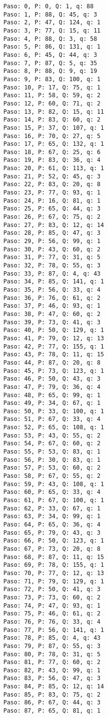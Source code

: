 \documentclass[a4paper]{article}
\begin{document}
\begin{verbatim}
Paso: 0, P: 0, Q: 1, q: 88
Paso: 1, P: 88, Q: 45, q: 3
Paso: 2, P: 47, Q: 124, q: 1
Paso: 3, P: 77, Q: 15, q: 11
Paso: 4, P: 88, Q: 3, q: 58
Paso: 5, P: 86, Q: 131, q: 1
Paso: 6, P: 45, Q: 44, q: 3
Paso: 7, P: 87, Q: 5, q: 35
Paso: 8, P: 88, Q: 9, q: 19
Paso: 9, P: 83, Q: 100, q: 1
Paso: 10, P: 17, Q: 75, q: 1
Paso: 11, P: 58, Q: 59, q: 2
Paso: 12, P: 60, Q: 71, q: 2
Paso: 13, P: 82, Q: 15, q: 11
Paso: 14, P: 83, Q: 60, q: 2
Paso: 15, P: 37, Q: 107, q: 1
Paso: 16, P: 70, Q: 27, q: 5
Paso: 17, P: 65, Q: 132, q: 1
Paso: 18, P: 67, Q: 25, q: 6
Paso: 19, P: 83, Q: 36, q: 4
Paso: 20, P: 61, Q: 113, q: 1
Paso: 21, P: 52, Q: 45, q: 3
Paso: 22, P: 83, Q: 20, q: 8
Paso: 23, P: 77, Q: 93, q: 1
Paso: 24, P: 16, Q: 81, q: 1
Paso: 25, P: 65, Q: 44, q: 3
Paso: 26, P: 67, Q: 75, q: 2
Paso: 27, P: 83, Q: 12, q: 14
Paso: 28, P: 85, Q: 47, q: 3
Paso: 29, P: 56, Q: 99, q: 1
Paso: 30, P: 43, Q: 60, q: 2
Paso: 31, P: 77, Q: 31, q: 5
Paso: 32, P: 78, Q: 55, q: 3
Paso: 33, P: 87, Q: 4, q: 43
Paso: 34, P: 85, Q: 141, q: 1
Paso: 35, P: 56, Q: 33, q: 4
Paso: 36, P: 76, Q: 61, q: 2
Paso: 37, P: 46, Q: 93, q: 1
Paso: 38, P: 47, Q: 60, q: 2
Paso: 39, P: 73, Q: 41, q: 3
Paso: 40, P: 50, Q: 129, q: 1
Paso: 41, P: 79, Q: 12, q: 13
Paso: 42, P: 77, Q: 155, q: 1
Paso: 43, P: 78, Q: 11, q: 15
Paso: 44, P: 87, Q: 20, q: 8
Paso: 45, P: 73, Q: 123, q: 1
Paso: 46, P: 50, Q: 43, q: 3
Paso: 47, P: 79, Q: 36, q: 4
Paso: 48, P: 65, Q: 99, q: 1
Paso: 49, P: 34, Q: 67, q: 1
Paso: 50, P: 33, Q: 100, q: 1
Paso: 51, P: 67, Q: 33, q: 4
Paso: 52, P: 65, Q: 108, q: 1
Paso: 53, P: 43, Q: 55, q: 2
Paso: 54, P: 67, Q: 60, q: 2
Paso: 55, P: 53, Q: 83, q: 1
Paso: 56, P: 30, Q: 83, q: 1
Paso: 57, P: 53, Q: 60, q: 2
Paso: 58, P: 67, Q: 55, q: 2
Paso: 59, P: 43, Q: 108, q: 1
Paso: 60, P: 65, Q: 33, q: 4
Paso: 61, P: 67, Q: 100, q: 1
Paso: 62, P: 33, Q: 67, q: 1
Paso: 63, P: 34, Q: 99, q: 1
Paso: 64, P: 65, Q: 36, q: 4
Paso: 65, P: 79, Q: 43, q: 3
Paso: 66, P: 50, Q: 123, q: 1
Paso: 67, P: 73, Q: 20, q: 8
Paso: 68, P: 87, Q: 11, q: 15
Paso: 69, P: 78, Q: 155, q: 1
Paso: 70, P: 77, Q: 12, q: 13
Paso: 71, P: 79, Q: 129, q: 1
Paso: 72, P: 50, Q: 41, q: 3
Paso: 73, P: 73, Q: 60, q: 2
Paso: 74, P: 47, Q: 93, q: 1
Paso: 75, P: 46, Q: 61, q: 2
Paso: 76, P: 76, Q: 33, q: 4
Paso: 77, P: 56, Q: 141, q: 1
Paso: 78, P: 85, Q: 4, q: 43
Paso: 79, P: 87, Q: 55, q: 3
Paso: 80, P: 78, Q: 31, q: 5
Paso: 81, P: 77, Q: 60, q: 2
Paso: 82, P: 43, Q: 99, q: 1
Paso: 83, P: 56, Q: 47, q: 3
Paso: 84, P: 85, Q: 12, q: 14
Paso: 85, P: 83, Q: 75, q: 2
Paso: 86, P: 67, Q: 44, q: 3
Paso: 87, P: 65, Q: 81, q: 1

\end{verbatim}
\end{document}
